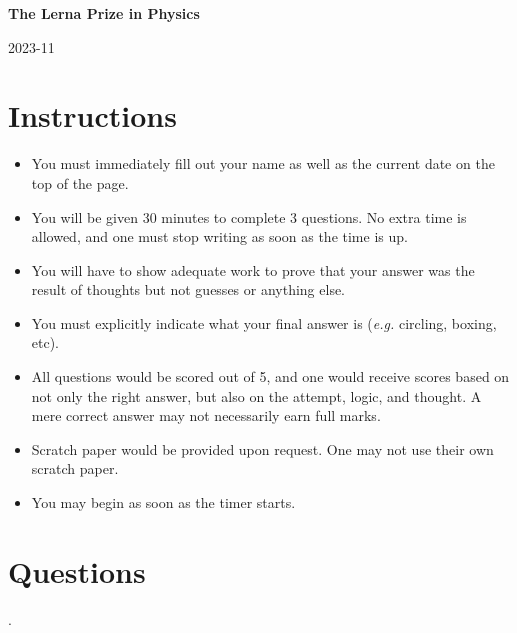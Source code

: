 \documentclass{exam}
\begin{document}
    \begin{center}
        \LARGE{\textbf{The Lerna Prize in Physics}}

        \vspace{8pt}

        \large{2023-11}
    \end{center}

    \section*{Instructions}
    \begin{itemize}
        \item You must immediately fill out your name as well as the current date on the top of the page.
        \item You will be given 30 minutes to complete 3 questions. No extra time is allowed, and one must stop writing as soon as the time is up.
        \item You will have to show adequate work to prove that your answer was the result of thoughts but not guesses or anything else.
        \item You must explicitly indicate what your final answer is (\textit{e.g.} circling, boxing, etc).
        \item All questions would be scored out of 5, and one would receive scores based on not only the right answer, but also on the attempt, logic, and thought. A mere correct answer may not necessarily earn full marks.
        \item Scratch paper would be provided upon request. One may not use their own scratch paper.
        \item You may begin as soon as the timer starts.
      \end{itemize}

\section*{Questions}

\begin{questions}
    .

    \pagebreak


    \pagebreak

\end{questions}
\end{document}
